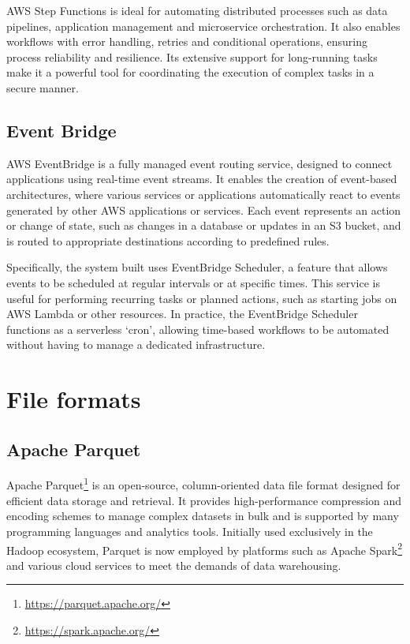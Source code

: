 \ac{AWS} Step Functions is ideal for automating distributed processes such as data pipelines, application management and microservice orchestration. It also enables workflows with error handling, retries and conditional operations, ensuring process reliability and resilience. Its extensive support for long-running tasks make it a powerful tool for coordinating the execution of complex tasks in a secure manner.
\subsection{Event Bridge}
\ac{AWS} EventBridge is a fully managed event routing service, designed to connect applications using real-time event streams. It enables the creation of event-based architectures, where various services or applications automatically react to events generated by other \ac{AWS} applications or services. Each event represents an action or change of state, such as changes in a database or updates in an \ac{S3} bucket, and is routed to appropriate destinations according to predefined rules.

Specifically, the system built uses EventBridge Scheduler, a feature that allows events to be scheduled at regular intervals or at specific times. This service is useful for performing recurring tasks or planned actions, such as starting jobs on \ac{AWS} Lambda or other resources. In practice, the EventBridge Scheduler functions as a serverless ‘cron’, allowing time-based workflows to be automated without having to manage a dedicated infrastructure.
\section{File formats}
\subsection{Apache Parquet}
\label{sec:parquet}
Apache Parquet\footnote{\url{https://parquet.apache.org/}} is an open-source, column-oriented data file format designed for efficient data storage and retrieval. It provides high-performance compression and encoding schemes to manage complex datasets in bulk and is supported by many programming languages and analytics tools. Initially used exclusively in the Hadoop ecosystem, Parquet is now employed by platforms such as Apache Spark\footnote{\url{https://spark.apache.org/}} and various cloud services to meet the demands of data warehousing.

